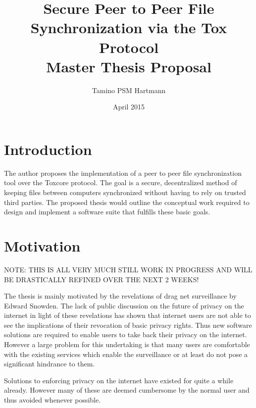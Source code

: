 \documentclass[twoside]{article}
\begin{document}
\title{\textbf{Secure Peer to Peer File Synchronization via the Tox Protocol}\\{\Large Master Thesis Proposal}}
\author{Tamino PSM Hartmann}
\date{April 2015}
\maketitle

\setcounter{secnumdepth}{0}
\pagestyle{headings}

\section{Introduction}

The author proposes the implementation of a peer to peer file synchronization tool over the Toxcore protocol.
The goal is a secure, decentralized method of keeping files between computers synchronized without having to rely on trusted third parties.
The proposed thesis would outline the conceptual work required to design and implement a software suite that fulfills these basic goals.

\section{Motivation}

NOTE: THIS IS ALL VERY MUCH STILL WORK IN PROGRESS AND WILL BE DRASTICALLY REFINED OVER THE NEXT 2 WEEKS!


The thesis is mainly motivated by the revelations of drag net surveillance by Edward Snowden.
The lack of public discussion on the future of privacy on the internet in light of these revelations has shown that internet users are not able to see the implications of their revocation of basic privacy rights.
Thus new software solutions are required to enable users to take back their privacy on the internet.
However a large problem for this undertaking is that many users are comfortable with the existing services which enable the surveillance or at least do not pose a significant hindrance to them.

Solutions to enforcing privacy on the internet have existed for quite a while already.
However many of these are deemed cumbersome by the normal user and thus avoided whenever possible.
\end{document}
